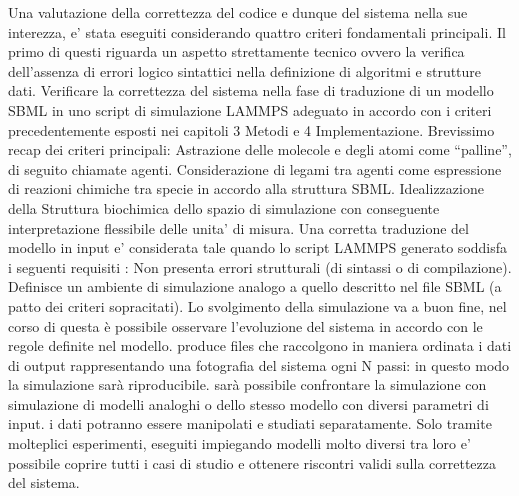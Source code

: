 \documentclass[Lau, oneside]{sapthesis}
\begin{document}
Una valutazione della correttezza del codice e dunque del sistema nella sue interezza, e' stata eseguiti considerando quattro criteri fondamentali principali. Il primo di questi riguarda un aspetto strettamente tecnico ovvero la verifica dell'assenza di errori logico sintattici nella definizione di algoritmi e strutture dati.
Verificare la correttezza del sistema nella fase di traduzione di un modello SBML in uno script di simulazione LAMMPS adeguato in accordo con i criteri precedentemente esposti nei capitoli 3 Metodi e 4 Implementazione.
Brevissimo recap dei criteri principali:
Astrazione delle molecole e degli atomi come “palline”, di seguito chiamate agenti.
Considerazione di legami tra agenti come espressione di reazioni chimiche tra specie in accordo alla struttura SBML.
Idealizzazione della Struttura biochimica dello spazio di simulazione con conseguente interpretazione flessibile delle unita’ di misura.
Una corretta traduzione del modello in input e' considerata tale quando lo script LAMMPS generato soddisfa i seguenti requisiti :
Non presenta errori strutturali (di sintassi o di compilazione).
Definisce un ambiente di simulazione analogo a quello descritto nel file SBML (a patto dei criteri sopracitati).
Lo svolgimento della simulazione va a buon fine, nel corso di questa è possibile osservare l’evoluzione del sistema in accordo con le regole definite nel modello.
produce files che raccolgono in maniera ordinata i dati di output rappresentando una fotografia del sistema ogni N passi:
in questo modo la simulazione sarà riproducibile.
sarà possibile confrontare la simulazione con simulazione di modelli analoghi o dello stesso modello con diversi parametri di input.
i dati potranno essere manipolati e studiati separatamente.
Solo tramite molteplici esperimenti, eseguiti impiegando modelli molto diversi tra loro e’ possibile coprire tutti i casi di studio e ottenere riscontri validi sulla correttezza del sistema.

\newpage
\end{document}

